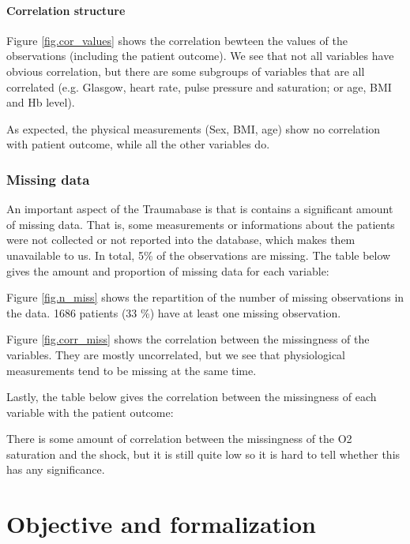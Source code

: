 \paragraph{Correlation structure}

Figure \ref{fig.cor_values} shows the correlation bewteen the values of the observations (including the patient outcome). We see that not all variables have obvious correlation, but there are some subgroups of variables that are all correlated (e.g. Glasgow, heart rate, pulse pressure and saturation; or age, BMI and Hb level). 

As expected, the physical measurements (Sex, BMI, age) show no correlation with patient outcome, while all the other variables do. 



			\subsubsection{Missing data}
			
An important aspect of the Traumabase is that is contains a significant amount of missing data. That is, some measurements or informations about the patients were not collected or not reported into the database, which makes them unavailable to us. In total, 5\% of the observations are missing. The table below gives the amount and proportion of missing data for each variable:



Figure \ref{fig.n_miss} shows the repartition of the number of missing observations in the data. 1686 patients (33 \%) have at least one missing observation.


			
Figure \ref{fig.corr_miss} shows the correlation between the missingness of the variables. They are mostly uncorrelated, but we see that physiological measurements tend to be missing at the same time.



Lastly, the table below gives the correlation between the missingness of each variable with the patient outcome:



There is some amount of correlation between the missingness of the O2 saturation and the shock, but it is still quite low so it is hard to tell whether this has any significance.

	\section{Objective and formalization}
